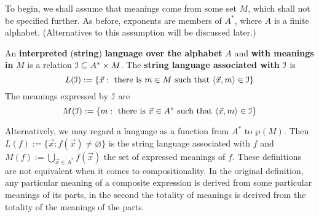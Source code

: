 To begin, we shall assume that meanings come from some set
$M$, which shall not be specified further. As before, exponents
are members of $A^{\ast}$, where $A$ is a finite alphabet.
(Alternatives to this assumption will be discussed later.)
\begin{defn}
An \textbf{interpreted} (\textbf{string}) \textbf{language over the
alphabet} $A$ and \textbf{with meanings in} $M$ is a relation
$\mathcal{I} \subseteq A^{\ast} \times M$. The \textbf{string language
associated with} $\mathcal{I}$ is
\begin{equation}
L(\mathcal{I}) := \{\vec{x} : \text{ there is }
m \in M \text{ such that } \langle \vec{x}, m\rangle \in \mathcal{I}\}
\end{equation}
The meanings expressed by $\mathcal{I}$ are
\begin{equation}
M(\mathcal{I}) := \{m  : \text{ there is } \vec{x} \in A^{\ast}
\text{ such that }\langle \vec{x}, m\rangle \in \mathcal{I}\}
\end{equation}
\end{defn}
Alternatively, we may regard a language as a function from 
$A^{\ast}$ to $\wp(M)$. Then $L(f) := \{\vec{x} : f(\vec{x})
\neq \varnothing\}$ is the string language associated with
$f$ and $M(f) := \bigcup_{\vec{x} \in A^{\ast}} f(\vec{x})$
the set of expressed meanings of $f$. These definitions are 
not equivalent when it comes to compositionality. In the 
original definition, any particular meaning of a composite 
expression is derived from some particular meanings of its 
parts, in the second the totality of meanings is derived from 
the totality of the meanings of the parts. 

